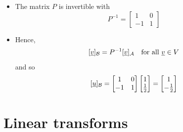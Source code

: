 \documentclass[11pt,twoside]{report}
\newcommand{\vecnot}{\underline}
\begin{document}
\begin{itemize}
\begin{itemize}
\item The matrix $P$ is invertible with
\[
P^{-1} =  \begin{bmatrix} 1 & 0 \\ -1 & 1 \end{bmatrix} 
\] 
\item Hence, 
\[
  [\vecnot{v}]_{\cB}  = P^{-1}   [\vecnot{v}]_{\cA}  \quad \text{for all $\vecnot{v} \in V$}
\]
and so 
\[
[\vecnot{u}]_{\cB}  =  \begin{bmatrix} 1 & 0 \\ -1 & 1 \end{bmatrix} \begin{bmatrix} 1 \\  \tfrac{1}{2} \end{bmatrix}  = \begin{bmatrix} 1 \\ - \tfrac{1}{2} \end{bmatrix} 
\]
\end{itemize} 




\end{itemize}


\section{Linear transforms} 
\end{document}
